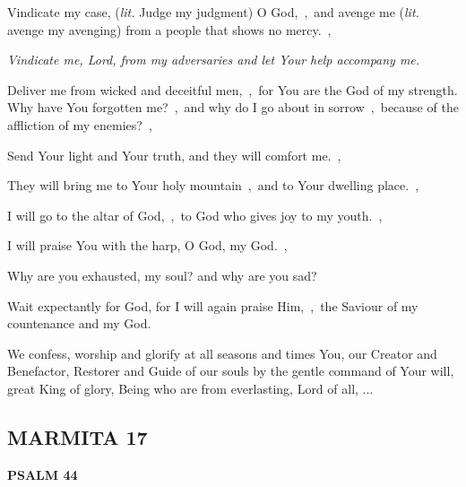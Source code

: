 \documentclass[12pt,twoside,a5paper]{article}
\newcommand{\marmita}[1]{\subsection*{MARMITA {#1}}}
\newcommand{\psalm}[1]{\textbf{PSALM {#1}}\nopagebreak}
\newcommand{\qanona}[1]{{\liturgicalhint{Qanona.} \emph{#1}}}
\newcommand{\slota}[1]{\liturgicalhint{Slota.} #1}
\newcommand{\translationliteral}[1]{\emph{lit.} #1}
\begin{document}
\begin{normalparskip}
  Vindicate my case, (\translationliteral{Judge my judgment}) O God,~\sep\ and avenge me (\translationliteral{avenge my avenging}) from a people that shows no mercy.~\sep

  \qanona{Vindicate me, Lord, from my adversaries and let Your help accompany me.}

  Deliver me from wicked and deceitful men,~\sep\ for You are the God of my strength. Why have You forgotten me?~\sep\ and why do I go about in sorrow~\sep\ because of the affliction of my enemies?~\sep

  Send Your light and Your truth, and they will comfort me.~\sep

  They will bring me to Your holy mountain~\sep\ and to Your dwelling place.~\sep

  I will go to the altar of God,~\sep\ to God who gives joy to my youth.~\sep

  I will praise You with the harp, O God, my God.~\sep

  Why are you exhausted, my soul? and why are you sad?

  Wait expectantly for God, for I will again praise Him,~\sep\ the Saviour of my countenance and my God.
\end{normalparskip}

\slota{We confess, worship and glorify at all seasons and times You, our Creator and Benefactor, Restorer and Guide of our souls by the gentle command of Your will, great King of glory, Being who are from everlasting, Lord of all, ...}

\marmita{17}

\psalm{44}
\end{document}
